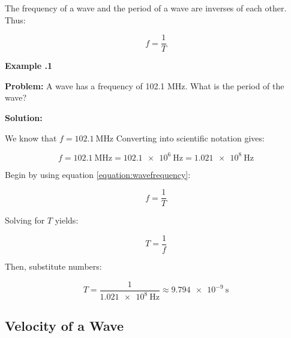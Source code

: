 	The frequency of a wave and the period of a wave are inverses of each other.  Thus:
	
	
	\begin{mdframed}[backgroundcolor=orange!20!white]
		\begin{equation}
		f = \frac{1}{T}
		\label{equation:wavefrequency}
		\end{equation}
	\end{mdframed}	
	
	
	\begin{mdframed}[backgroundcolor=blue!10!white]
		\begin{center}
			
			
			\textbf{Example \thesection.1}	
		\end{center}
		
		\textbf{Problem: }A wave has a frequency of 102.1 MHz.  What is the period of the wave?
		\vspace{0.1in}
		
		\textbf{Solution:} 
		
		We know that $f = \SI{102.1}{\mega\hertz} $ Converting into scientific notation gives:
		 
		 	
		 \begin{equation*}
		 f = \SI{102.1}{\mega\hertz} = \SI{102.1e6}{\hertz} = \boxed{ \SI{1.021e8}{\hertz}}
		 \end{equation*}
		 
		
		Begin by using equation \ref{equation:wavefrequency}:
		
		
		\begin{equation*}
		f = \frac{1}{T}
		\end{equation*}
		
		Solving for $T$ yields:
		
		\begin{equation*}
			T = \frac{1}{f}
		\end{equation*}		
		
		Then, substitute numbers: 
		
		\begin{equation*}
		T = \frac{1}{\SI{1.021e8}{\hertz}} \approx \boxed{\SI{9.794e-9}{\s}}
		\end{equation*}		
		
	\end{mdframed}
	
	\subsection{Velocity of a Wave}  
	
